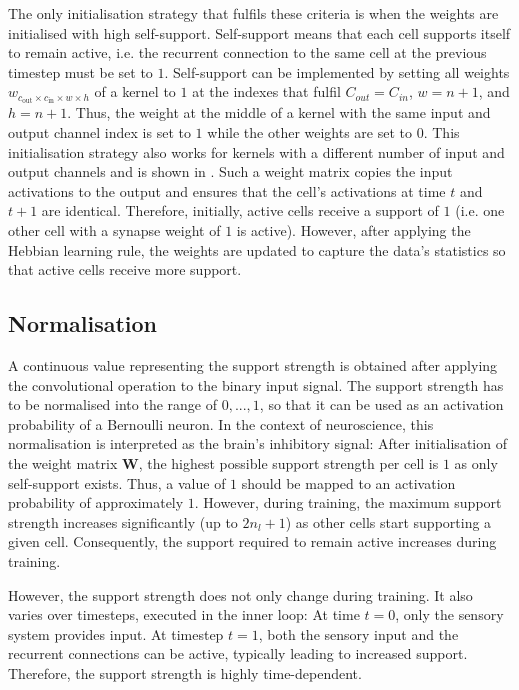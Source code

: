 The only initialisation strategy that fulfils these criteria is when the weights are initialised with high self-support.
Self-support means that each cell supports itself to remain active, i.e. the recurrent connection to the same cell at the previous timestep must be set to $1$.
Self-support can be implemented by setting all weights $w_{c_{\text{out}} \times c_{\text{in}} \times w \times h}$ of a kernel to $1$ at the indexes that fulfil 
$C_{out} = C_{in}$, $w = n+1$, and $h = n+1$. Thus, the weight at the middle of a kernel with the same input and output channel index is set to $1$ while the other weights are set to $0$. This initialisation strategy also works for kernels with a different number of input and output channels and is shown in .
Such a weight matrix copies the input activations to the output and ensures that the cell's activations at time $t$ and $t+1$ are identical. Therefore, initially, active cells receive a support of $1$ (i.e. one other cell with a synapse weight of $1$ is active).
However, after applying the Hebbian learning rule, the weights are updated to capture the data's statistics so that active cells receive more support.

\subsection{Normalisation}
A continuous value representing the support strength is obtained after applying the convolutional operation to the binary input signal.
The support strength has to be normalised into the range of $0, ..., 1$, so that it can be used as an activation probability of a Bernoulli neuron.
In the context of neuroscience, this normalisation is interpreted as the brain's inhibitory signal:
After initialisation of the weight matrix $\boldsymbol{W}$, the highest possible support strength per cell is $1$ as only self-support exists. Thus, a value of $1$ should be mapped to an activation probability of approximately $1$. However, during training, the maximum support strength increases significantly (up to $2n_l + 1$) as other cells start supporting a given cell.
Consequently, the support required to remain active increases during training.

However, the support strength does not only change during training. It also varies over timesteps, executed in the inner loop: At time $t=0$, only the sensory system provides input. At timestep $t=1$, both the sensory input and the recurrent connections can be active, typically leading to increased support. Therefore, the support strength is highly time-dependent.

